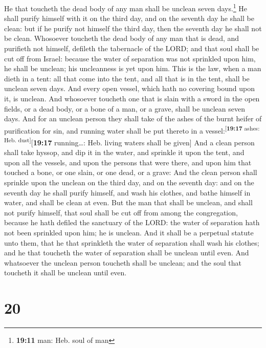  He that toucheth the dead body of any man shall be
unclean seven days.\footnote{\textbf{19:11} man: Heb. soul of man}
 He shall purify himself with it on the third day, and on
the seventh day he shall be clean: but if he purify not himself the
third day, then the seventh day he shall not be clean. 
Whosoever toucheth the dead body of any man that is dead, and purifieth
not himself, defileth the tabernacle of the LORD; and that soul shall be
cut off from Israel: because the water of separation was not sprinkled
upon him, he shall be unclean; his uncleanness is yet upon him.
 This is the law, when a man dieth in a tent: all that
come into the tent, and all that is in the tent, shall be unclean seven
days.  And every open vessel, which hath no covering
bound upon it, is unclean.  And whosoever toucheth one
that is slain with a sword in the open fields, or a dead body, or a bone
of a man, or a grave, shall be unclean seven days.  And
for an unclean person they shall take of the ashes of the burnt heifer
of purification for sin, and running water shall be put thereto in a
vessel:\textsuperscript{{[}\textbf{19:17} ashes: Heb.
dust{]}}{[}\textbf{19:17} running\ldots: Heb. living waters shall be
given{]}  And a clean person shall take hyssop, and dip
it in the water, and sprinkle it upon the tent, and upon all the
vessels, and upon the persons that were there, and upon him that touched
a bone, or one slain, or one dead, or a grave:  And the
clean person shall sprinkle upon the unclean on the third day, and on
the seventh day: and on the seventh day he shall purify himself, and
wash his clothes, and bathe himself in water, and shall be clean at
even.  But the man that shall be unclean, and shall not
purify himself, that soul shall be cut off from among the congregation,
because he hath defiled the sanctuary of the LORD: the water of
separation hath not been sprinkled upon him; he is unclean.
 And it shall be a perpetual statute unto them, that he
that sprinkleth the water of separation shall wash his clothes; and he
that toucheth the water of separation shall be unclean until even.
 And whatsoever the unclean person toucheth shall be
unclean; and the soul that toucheth it shall be unclean until even.

\hypertarget{section-19}{%
\section{20}\label{section-19}}

